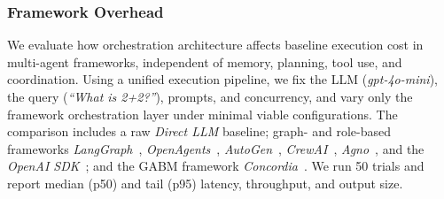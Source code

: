 


% 




\vspace{-2mm}
\subsubsection{Framework Overhead}
\label{sec:framework-overhead}

We evaluate how orchestration architecture affects baseline execution cost in multi-agent frameworks, independent of memory, planning, tool use, and coordination. Using a unified execution pipeline, we fix the LLM (\emph{gpt-4o-mini}), the query (\emph{``What is 2+2?''}), prompts, and concurrency, and vary only the framework orchestration layer under minimal viable configurations. The comparison includes a raw \emph{Direct LLM} baseline; graph- and role-based frameworks \emph{LangGraph}~\cite{langgraph2025}, \emph{OpenAgents}~\cite{OpenAgents}, \emph{AutoGen}~\cite{wu2024autogen}, \emph{CrewAI}~\cite{crewai2025}, \emph{Agno}~\cite{agno2025}, and the \emph{OpenAI SDK}~\cite{openaiagents2025}; and the GABM framework \emph{Concordia}~\cite{vezhnevets2023generative}. We run 50 trials and report median (p50) and tail (p95) latency, throughput, and output size. 

